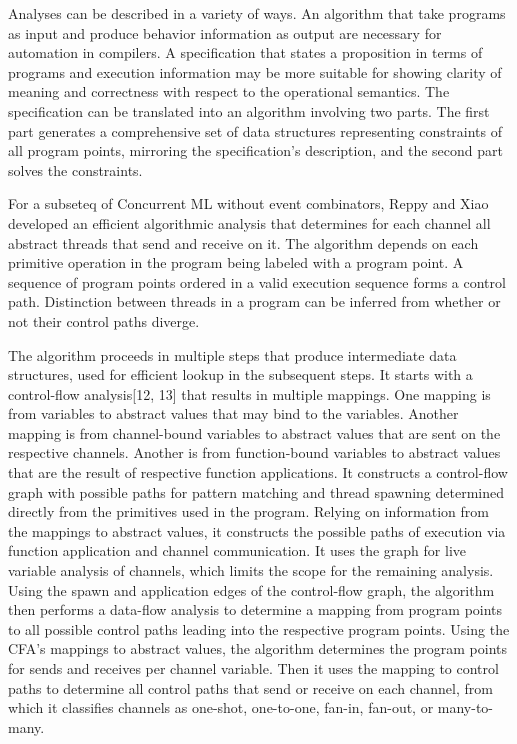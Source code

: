 \documentclass{article}
\begin{document}
Analyses can be described in a variety of ways.  An algorithm that take programs as input and
produce behavior information as output are necessary for automation in compilers.  A
specification that states a proposition in terms of programs and execution information may be
more suitable for showing clarity of meaning and correctness with respect to the operational
semantics.  The specification can be translated into an algorithm involving two parts.  The
first part generates a comprehensive set of data structures representing constraints of all
program points, mirroring the specification's description, and the second part solves the
constraints.

For a subseteq of Concurrent ML without event combinators, Reppy and  Xiao developed an
efficient algorithmic analysis that determines for each channel all abstract threads that send
and receive on it.  The algorithm depends on each primitive operation in the program being
labeled with a program point.  A sequence of program points ordered in a valid execution
sequence forms a control path.  Distinction between threads in a program can be inferred from
whether or not their control paths diverge.  

The algorithm proceeds in multiple steps that produce intermediate data structures, used for
efficient lookup in the subsequent steps.  It starts with a control-flow analysis[12, 13] that
results in multiple mappings. One mapping is from variables to abstract values that may bind to
the variables.  Another mapping is from channel-bound variables to abstract values that are
sent on the respective channels.  Another is from function-bound variables to abstract values
that are the result of respective function applications.  It constructs a control-flow graph 
with possible paths for pattern matching and thread spawning determined directly from the
primitives used in the program.  Relying on information from the mappings to abstract values,
it constructs the possible paths of execution via function application and channel
communication.  It uses the graph for live variable analysis of channels, which limits the
scope for the remaining analysis.  Using the spawn and application edges of the control-flow
graph, the algorithm then performs a data-flow analysis to determine a mapping from program
points to all possible control paths leading into the respective program points.  Using the
CFA's mappings to abstract values, the algorithm determines the program points for sends and
receives per channel variable.  Then it uses the mapping to control paths to determine all
control paths that send or receive on each channel, from which it classifies channels as
one-shot, one-to-one, fan-in, fan-out, or many-to-many.
\end{document}
